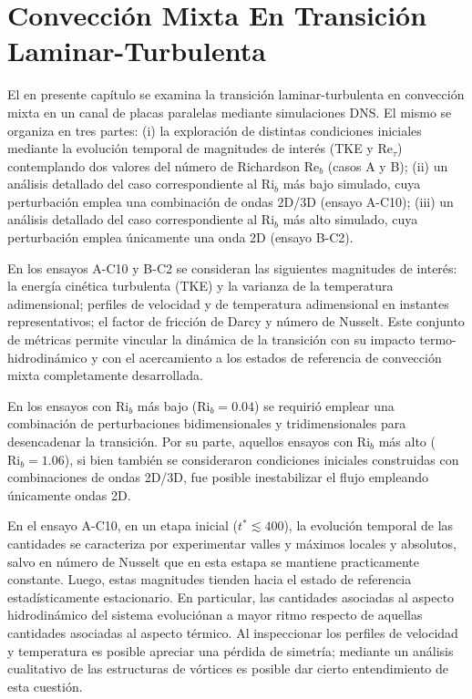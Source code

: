\chapter{Convección Mixta En Transición Laminar-Turbulenta} \label{cap:transicion}

El en presente capítulo se examina la transición laminar-turbulenta en convección mixta en un canal de placas paralelas mediante simulaciones DNS. El mismo se organiza en tres partes: (i) la exploración de distintas condiciones iniciales mediante la evolución temporal de magnitudes de interés (TKE y Re$_{\tau}$) contemplando dos valores del número de Richardson Re$_b$ (casos A y B); (ii) un análisis detallado del caso correspondiente al Ri$_b$ más bajo simulado, cuya perturbación emplea una combinación de ondas 2D/3D (ensayo A-C10); (iii) un análisis detallado del caso correspondiente al Ri$_b$ más alto simulado, cuya perturbación emplea únicamente una onda 2D (ensayo B-C2). %

En los ensayos A-C10 y B-C2 se consideran las siguientes magnitudes de interés: la energía cinética turbulenta (TKE) y la varianza de la temperatura adimensional; perfiles de velocidad y de temperatura adimensional en instantes representativos; el factor de fricción de Darcy y número de Nusselt. Este conjunto de métricas permite vincular la dinámica de la transición con su impacto termo-hidrodinámico y con el acercamiento a los estados de referencia de convección mixta completamente desarrollada.

En los ensayos con Ri$_b$ más bajo ($\text{Ri}_b=0\text{.}04$) se requirió emplear una combinación de perturbaciones bidimensionales y tridimensionales para desencadenar la transición. Por su parte, aquellos ensayos con Ri$_b$ más alto ($\text{Ri}_b=1\text{.}06$), si bien también se consideraron condiciones iniciales construidas con combinaciones de ondas 2D/3D, fue posible inestabilizar el flujo empleando únicamente ondas 2D. 

En el ensayo A-C10, en un etapa inicial ($t^*\lesssim 400$), la evolución temporal de las cantidades se caracteriza por experimentar valles y máximos locales y absolutos, salvo en número de Nusselt que en esta estapa se mantiene practicamente constante. Luego, estas magnitudes tienden hacia el estado de referencia estadísticamente estacionario. En particular, las cantidades asociadas al aspecto hidrodinámico del sistema evoluciónan a mayor ritmo respecto de aquellas cantidades asociadas al aspecto térmico. Al inspeccionar los perfiles de velocidad y temperatura es posible apreciar una pérdida de simetría; mediante un análisis cualitativo de las estructuras de vórtices es posible dar cierto entendimiento de esta cuestión.  

